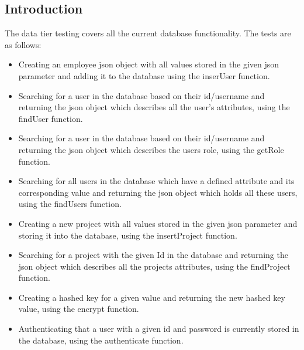 \documentclass[]{article}
\begin{document}
	\subsection{Introduction}
	\begin{flushleft}
        The data tier testing covers all the current database functionality. The tests are as follows: 
        \begin{itemize}
    		\item Creating an employee json object with all values stored in the given json parameter and adding it to the database using the inserUser function. 
    		
            \item Searching for a user in the database based on their id/username and returning the json object which describes all the user's attributes, using the findUser function.
            
            \item Searching for a user in the database based on their id/username and returning the json object which describes the users role, using the getRole function.
            
            \item Searching for all users in the database which have a defined attribute and its corresponding value and returning the json object which holds all these users, using the findUsers function. 
            
            \item Creating a new project  with all values stored in the given json parameter and storing it into the database, using the insertProject function.
            
            \item Searching for a project with the given Id in the database and returning the json object which describes all the projects attributes, using the findProject function.
            
            \item Creating a hashed key for a given value and returning the new hashed key value, using the encrypt function.
            
            \item Authenticating that a user with a given id and password is currently stored in the database, using the authenticate function. 
        \end{itemize}
    \end{flushleft}
        
\end{document}
